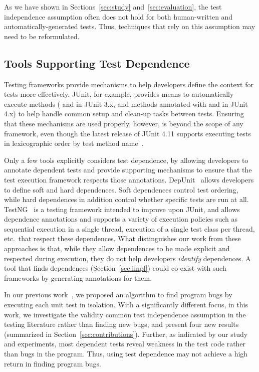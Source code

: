 As we have shown in Sections~\ref{sec:study} and~\ref{sec:evaluation},
the test independence assumption often does not hold for both
human-written and automatically-generated tests. Thus, techniques
that rely on this assumption may need to be reformulated.

\subsection{Tools Supporting Test Dependence}
\label{sec:supporting}

Testing frameworks provide mechanisms
to help developers define the context for tests more effectively.
JUnit, for example, provides means to
automatically execute methods ( and  in JUnit
3.x, and methods annotated with  and  in
JUnit 4.x) to help handle common setup and clean-up tasks between
tests. Ensuring that these mechanisms are used properly, however, is
beyond the scope of any framework, even though the latest release of JUnit 4.11
supports executing tests in lexicographic order by test method name~\cite{junitordering}.


Only a few tools explicitly considers test dependence, by
allowing developers to annotate dependent tests and
provide supporting mechanisms to ensure that the test execution framework
respects those annotations.  DepUnit~\cite{depunit}
allows developers to define soft and hard dependences. Soft dependences control
test ordering, while hard dependences in addition control whether specific tests are
run at all.  TestNG~\cite{testng} is a testing framework intended to improve upon JUnit,
and allows dependence annotations and supports a variety of execution policies such as sequential execution
in a single thread, execution of a single test class per thread, etc.\
that respect these dependences.
What distinguishes our work from these approaches is that, while they allow dependences
to be made explicit and respected during execution, they do not help developers
\emph{identify} dependences.  A tool that finds dependences
(Section~\ref{sec:impl}) could co-exist
with such frameworks by generating annotations for them.

In our previous work~\cite{DBLP:conf/sigsoft/MusluSW11}, we proposed
an algorithm to find program bugs by executing each unit
test in isolation. With a significantly different focus,
in this work, we investigate the validity common test independence assumption
in the testing literature rather than finding new bugs,
and present four new results (summarized in Section~\ref{sec:contributions}).
Further, as indicated by our study and experiments, most dependent
tests reveal weakness in the test code rather than bugs in the program. Thus,
using test dependence may not achieve a high return in finding program bugs.
